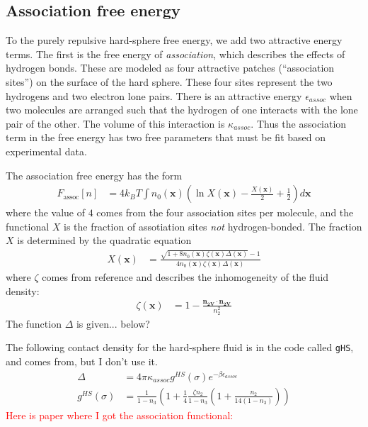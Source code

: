 \documentclass[letterpaper,twocolumn,amsmath,amssymb,prb]{revtex4-1}
\newcommand{\xx}{\textbf{x}}
\begin{document}
\subsection{Association free energy}
To the purely repulsive hard-sphere free energy, we add two attractive
energy terms.  The first is the free energy of \emph{association},
which describes the effects of hydrogen bonds.  These are modeled as
four attractive patches (``association sites'') on the surface of the
hard sphere.  These four sites represent the two hydrogens and two
electron lone pairs.  There is an attractive energy
$\epsilon_\textit{assoc}$ when two molecules are arranged such that
the hydrogen of one interacts with the lone pair of the other.  The
volume of this interaction is $\kappa_\textit{assoc}$.  Thus the
association term in the free energy has two free parameters that must
be fit based on experimental data.

The association free energy has the form
\begin{align}
  F_\text{assoc}[n] &= 4 k_BT \int n_0(\xx)
  \left(\ln X(\xx) - \frac{X(\xx)}{2} + \frac12\right) d\xx
\end{align}
where the value of $4$ comes from the four association sites per
molecule, and the functional $X$ is the fraction of assotiation sites
\emph{not} hydrogen-bonded.  The fraction $X$ is determined by the
quadratic equation
\begin{align}
  X(\xx) &= \frac{\sqrt{1 + 8n_0(\xx)\zeta(\xx)\Delta(\xx)} - 1}
  {4 n_0(\xx)\zeta(\xx)\Delta(\xx)}
\end{align}
where $\zeta$ comes from
reference\cite{yu2002fmt-dft-inhomogeneous-associating,
  fu2005vapor-liquid-dft} and describes the inhomogeneity of the fluid
density:
\begin{align}
  \zeta(\xx) &= 1 - \frac{\mathbf{n_{2V}}\cdot\mathbf{n_{2V}}}{n_2^2}
\end{align}
The function $\Delta$ is given... below?

The following contact density for the hard-sphere fluid is in the code
called \texttt{gHS}, and comes
from\cite{yu2002fmt-dft-inhomogeneous-associating,
  fu2005vapor-liquid-dft}, but I don't use it.
\begin{align}
  \Delta &= 4\pi \kappa_\textit{assoc} g^\textit{HS}(\sigma)e^{-\beta
    \epsilon_\textit{assoc}} \\
  g^\textit{HS}(\sigma) &= \frac1{1-n_3}\left(1+\frac14\frac{\zeta n_2}{1-n_3}
  \left(1 + \frac{n_2}{14 (1-n_3)}\right)\right)
\end{align}
\textcolor{red}{Here is paper where I got the association functional:}
\end{document}
